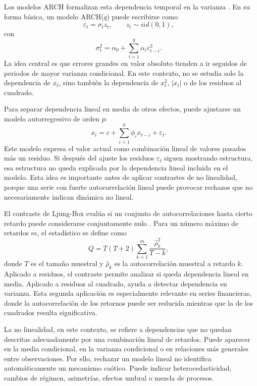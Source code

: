 Los modelos ARCH formalizan esta dependencia temporal en la varianza \cite{engle1982}. En su forma básica, un modelo ARCH(\(q\)) puede escribirse como
\begin{equation}
    \varepsilon_t = \sigma_t z_t,\qquad z_t \sim iid(0,1),
\end{equation}
con
\begin{equation}
    \sigma_t^2 = \alpha_0 + \sum_{i=1}^{q}\alpha_i \varepsilon_{t-i}^2.
\end{equation}
La idea central es que errores grandes en valor absoluto tienden a ir seguidos de periodos de mayor varianza condicional. En este contexto, no se estudia solo la dependencia de \(x_t\), sino también la dependencia de \(x_t^2\), \(|x_t|\) o de los residuos al cuadrado.

Para separar dependencia lineal en media de otros efectos, puede ajustarse un modelo autorregresivo de orden \(p\):
\begin{equation}
    x_t=c+\sum_{i=1}^{p}\phi_i x_{t-i}+\varepsilon_t.
\end{equation}
Este modelo expresa el valor actual como combinación lineal de valores pasados más un residuo. Si después del ajuste los residuos \(\varepsilon_t\) siguen mostrando estructura, esa estructura no queda explicada por la dependencia lineal incluida en el modelo. Esta idea es importante antes de aplicar contrastes de no linealidad, porque una serie con fuerte autocorrelación lineal puede provocar rechazos que no necesariamente indican dinámica no lineal.

El contraste de Ljung-Box evalúa si un conjunto de autocorrelaciones hasta cierto retardo puede considerarse conjuntamente nulo \cite{ljung1978}. Para un número máximo de retardos \(m\), el estadístico se define como
\begin{equation}
    Q = T(T+2)\sum_{k=1}^{m}\frac{\hat{\rho}_k^2}{T-k},
\end{equation}
donde \(T\) es el tamaño muestral y \(\hat{\rho}_k\) es la autocorrelación muestral a retardo \(k\). Aplicado a residuos, el contraste permite analizar si queda dependencia lineal en media. Aplicado a residuos al cuadrado, ayuda a detectar dependencia en varianza. Esta segunda aplicación es especialmente relevante en series financieras, donde la autocorrelación de los retornos puede ser reducida mientras que la de los cuadrados resulta significativa.

La no linealidad, en este contexto, se refiere a dependencias que no quedan descritas adecuadamente por una combinación lineal de retardos. Puede aparecer en la media condicional, en la varianza condicional o en relaciones más generales entre observaciones. Por ello, rechazar un modelo lineal no identifica automáticamente un mecanismo caótico. Puede indicar heterocedasticidad, cambios de régimen, asimetrías, efectos umbral o mezcla de procesos.

